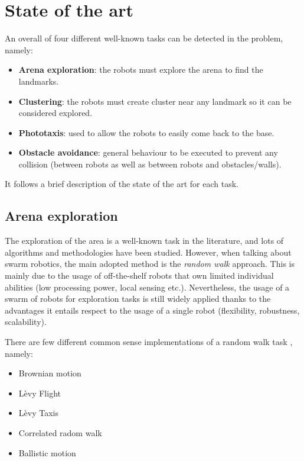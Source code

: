 \chapter{State of the art}

An overall of four different well-known tasks can be detected in the problem, namely:

\begin{itemize}

  \item \textbf{Arena exploration}: the robots must explore the arena to find the landmarks.
  \item \textbf{Clustering}: the robots must create cluster near any landmark so it can be considered explored.
  \item \textbf{Phototaxis}: used to allow the robots to easily come back to the base.
  \item \textbf{Obstacle avoidance}: general behaviour to be executed to prevent any collision (between robots as well as between robots and obstacles/walls).

\end{itemize}

\noindent
It follows a brief description of the state of the art for each task.

\section{Arena exploration}

The exploration of the area is a well-known task in the literature, and lots of algorithms and methodologies have been studied. However, when talking about swarm robotics, the main adopted method is the \textit{random walk} approach. This is mainly due to the usage of off-the-shelf robots that own limited individual abilities (low processing power, local sensing etc.). Nevertheless, the usage of a swarm of robots for exploration tasks is still widely applied thanks to the advantages it entails respect to the usage of a single robot (flexibility, robustness, scalability).

\bigskip
There are few different common sense implementations of a random walk task \cite{rw-summary}, namely:

\begin{itemize}

  \item {Brownian motion}
  
  \item {Lèvy Flight}
  
  \item {Lèvy Taxis}

  \item {Correlated radom walk}

  \item{Ballistic motion}  
\end{itemize}
 
